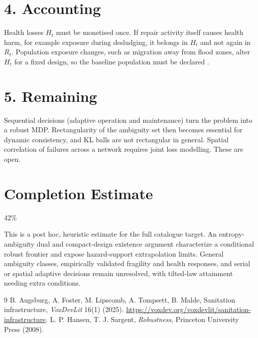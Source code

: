 \documentclass[11pt]{article}
\theoremstyle{definition}
\begin{document}
\section*{4. Accounting}
Health losses $H_t$ must be monetised once. If repair activity itself causes health harm, for example exposure during
desludging, it belongs in $H_t$ and not again in $R_t$. Population exposure changes, such as migration away from flood
zones, alter $H_t$ for a fixed design, so the baseline population must be declared \cite{afl}.

\section*{5. Remaining}
Sequential decisions (adaptive operation and maintenance) turn the problem into a robust MDP. Rectangularity of the
ambiguity set then becomes essential for dynamic consistency, and KL balls are not rectangular in general. Spatial
correlation of failures across a network requires joint loss modelling. These are open.

\section{Completion Estimate}
42\%

This is a post hoc, heuristic estimate for the full catalogue target.
An entropy-ambiguity dual and compact-design existence argument characterize a conditional robust frontier and expose hazard-support extrapolation limits. General ambiguity classes, empirically validated fragility and health responses, and serial or spatial adaptive decisions remain unresolved, with tilted-law attainment needing extra conditions.

\begin{thebibliography}{9}
 B. Augsburg, A. Foster, M. Lipscomb, A. Tompsett, B. Malde, Sanitation infrastructure, \emph{VoxDevLit} 16(1) (2025). \url{https://voxdev.org/voxdevlit/sanitation-infrastructure}.
 L. P. Hansen, T. J. Sargent, \emph{Robustness}, Princeton University Press (2008).
\end{thebibliography}
\end{document}
